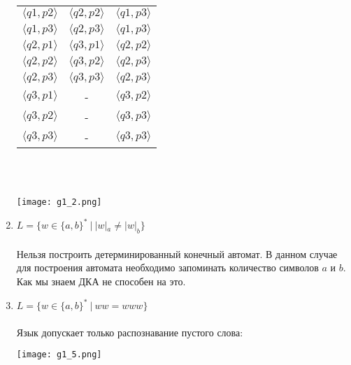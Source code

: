 \documentclass{article}
\begin{document}
\begin{enumerate}
\begin{tabular}{|c|c|c|}
         $\langle q1,p2 \rangle$    & $\langle q2,p2 \rangle$   & $\langle q1,p3 \rangle$    \\ 
         $\langle q1,p3 \rangle$    & $\langle q2,p3 \rangle$   & $\langle q1,p3 \rangle$    \\
         $\langle q2,p1 \rangle$    & $\langle q3,p1 \rangle$   & $\langle q2,p2 \rangle$    \\
         $\langle q2,p2 \rangle$    & $\langle q3,p2 \rangle$   & $\langle q2,p3 \rangle$    \\ 
         $\langle q2,p3 \rangle$    & $\langle q3,p3 \rangle$   & $\langle q2,p3 \rangle$    \\
         $\langle q3,p1 \rangle$    & -                         & $\langle q3,p2 \rangle$    \\
         $\langle q3,p2 \rangle$    & -                         & $\langle q3,p3 \rangle$    \\ 
         $\langle q3,p3 \rangle$    & -                         & $\langle q3,p3 \rangle$    \\ \hline
    \end{tabular} \\
    
    \\ 
    \begin{flushleft}
        \texttt{[image: g1\_2.png]}
    \end{flushleft}
    \item {$L = \{ w \in \{ a, b\}^* \ | \ |w|_a \neq |w|_b\}$} \\ \\ 
    Нельзя построить детерминированный конечный автомат. В данном случае для построения автомата необходимо запоминать количество символов $a$ и  $b$. Как мы знаем ДКА не способен на это.
    \item {$L = \{ w \in \{ a, b\}^* \ | \ { w w = w w w } \}$} \\ \\
    Язык допускает только распознавание пустого слова:
    \begin{flushleft}
        \texttt{[image: g1\_5.png]}
    \end{flushleft}
\end{enumerate}
\end{document}
